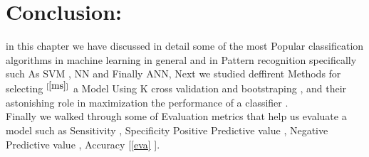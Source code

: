 \section{Conclusion:}

in this chapter we have discussed in detail some of the most Popular classification algorithms in machine learning in general and  in Pattern recognition specifically such As SVM , NN and Finally ANN, Next we studied deffirent Methods for selecting $^{[\ref{ms}]}$ a Model Using K cross validation and bootstraping , and their astonishing role in maximization the performance of a classifier . \\
Finally we walked through some of Evaluation metrics that help us evaluate a model such as Sensitivity , Specificity  Positive Predictive value , Negative Predictive value , Accuracy [\ref{eva} ]. \\
\newline


